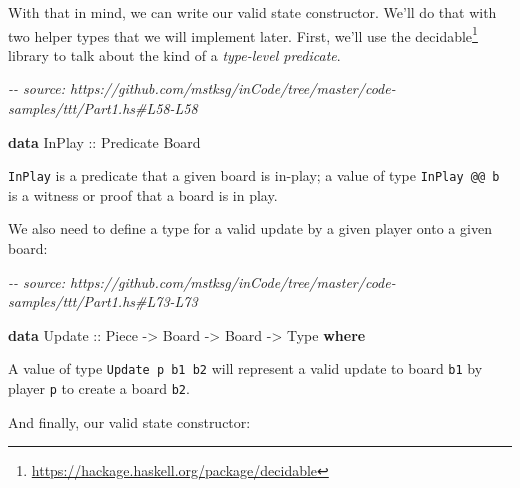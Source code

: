 \documentclass[]{article}
\newenvironment{Shaded}{}{}
\newcommand{\CommentTok}[1]{\textcolor[rgb]{0.38,0.63,0.69}{\textit{#1}}}
\newcommand{\DataTypeTok}[1]{\textcolor[rgb]{0.56,0.13,0.00}{#1}}
\newcommand{\KeywordTok}[1]{\textcolor[rgb]{0.00,0.44,0.13}{\textbf{#1}}}
\newcommand{\OtherTok}[1]{\textcolor[rgb]{0.00,0.44,0.13}{#1}}
\renewcommand{\href}[2]{#2\footnote{\url{#1}}}
\begin{document}
With that in mind, we can write our valid state constructor. We'll do that with
two helper types that we will implement later. First, we'll use the
\href{https://hackage.haskell.org/package/decidable}{decidable} library to talk
about the kind of a \emph{type-level predicate}.

\begin{Shaded}
\begin{Highlighting}[]
\CommentTok{{-}{-} source: https://github.com/mstksg/inCode/tree/master/code{-}samples/ttt/Part1.hs\#L58{-}L58}

\KeywordTok{data} \DataTypeTok{InPlay}\OtherTok{ ::} \DataTypeTok{Predicate} \DataTypeTok{Board}
\end{Highlighting}
\end{Shaded}

\texttt{InPlay} is a predicate that a given board is in-play; a value of type
\texttt{InPlay\ @@\ b} is a witness or proof that a board is in play.

We also need to define a type for a valid update by a given player onto a given
board:

\begin{Shaded}
\begin{Highlighting}[]
\CommentTok{{-}{-} source: https://github.com/mstksg/inCode/tree/master/code{-}samples/ttt/Part1.hs\#L73{-}L73}

\KeywordTok{data} \DataTypeTok{Update}\OtherTok{ ::} \DataTypeTok{Piece} \OtherTok{{-}\textgreater{}} \DataTypeTok{Board} \OtherTok{{-}\textgreater{}} \DataTypeTok{Board} \OtherTok{{-}\textgreater{}} \DataTypeTok{Type} \KeywordTok{where}
\end{Highlighting}
\end{Shaded}

A value of type \texttt{Update\ p\ b1\ b2} will represent a valid update to
board \texttt{b1} by player \texttt{p} to create a board \texttt{b2}.

And finally, our valid state constructor:
\end{document}
